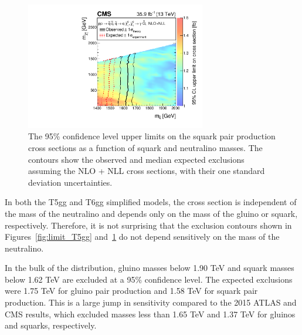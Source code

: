 \begin{figure}[h]
\begin{center}
\includegraphics[width=0.7\textwidth]{Figures/Results/T6ggXSEC.pdf}
\end{center}
    \caption{The 95\% confidence level upper limits on the squark pair
        production cross sections as a function of squark and neutralino masses.
        The contours show the observed and median expected exclusions assuming
        the NLO + NLL cross sections, with their one standard deviation
	uncertainties.}
    \label{fig:limit_T6gg}
\end{figure}

In both the T5gg and T6gg simplified models, the cross section is independent of the mass of the neutralino and 
depends only on the mass of the gluino or squark, respectively. Therefore, it is not surprising that the exclusion contours
shown in Figures~\ref{fig:limit_T5gg} and~\ref{fig:limit_T6gg}
do not depend sensitively on the mass of the neutralino. 

In the bulk of the distribution, gluino masses below 1.90 TeV and squark masses below 
1.62 TeV are excluded at a 95\% confidence level. The expected exclusions were
1.75 TeV for gluino pair production and 1.58 TeV for squark pair production. 
This is a large jump in sensitivity compared to the 2015 ATLAS and CMS results, which excluded 
masses less than 1.65 TeV and 1.37 TeV for gluinos and squarks, respectively. 


